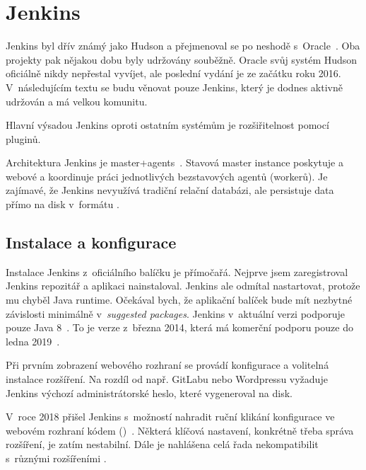 \section{Jenkins}
\label{sec:jenkins}
    Jenkins byl dřív známý jako Hudson a přejmenoval se po neshodě s~Oracle~\cite{jenkins-hudson}. Oba projekty pak nějakou dobu byly udržovány souběžně. Oracle svůj systém Hudson oficiálně nikdy nepřestal vyvíjet, ale poslední vydání je ze začátku roku 2016. V~následujícím textu se budu věnovat pouze Jenkins, který je dodnes aktivně udržován a má velkou komunitu.

    Hlavní výsadou Jenkins oproti ostatním \CICD systémům je rozšiřitelnost pomocí pluginů.

    Architektura Jenkins je master+agents~\cite{jenkins-architecture}. Stavová master instance poskytuje  a webové  a koordinuje práci jednotlivých bezstavových agentů (workerů). Je zajímavé, že Jenkins nevyužívá tradiční relační databázi, ale persistuje data přímo na disk v~formátu .

    \subsection{Instalace a konfigurace}
        Instalace Jenkins z~oficiálního balíčku je přímočařá. Nejprve jsem zaregistroval Jenkins  repozitář  a aplikaci nainstaloval. Jenkins ale odmítal nastartovat, protože mu chyběl Java runtime. Očekával bych, že aplikační balíček bude mít nezbytné závislosti minimálně v~\textit{suggested packages}. Jenkins v~aktuální verzi podporuje pouze Java 8~\cite{jenkins-java}. To je  verze z~března 2014, která má komerční podporu pouze do ledna 2019~\cite{oracle-eol}.

        Při prvním zobrazení webového rozhraní se provádí konfigurace a volitelná instalace rozšíření. Na rozdíl od např. GitLabu nebo Wordpressu vyžaduje Jenkins výchozí administrátorské heslo, které vygeneroval na disk.

        V~roce 2018 přišel Jenkins s~možností nahradit ruční klikání konfigurace ve webovém rozhraní kódem ()~\cite{jenkins-casc}. Některá klíčová nastavení, konkrétně třeba správa rozšíření, je zatím nestabilní. Dále je nahlášena celá řada nekompatibilit s~různými rozšířeními .

